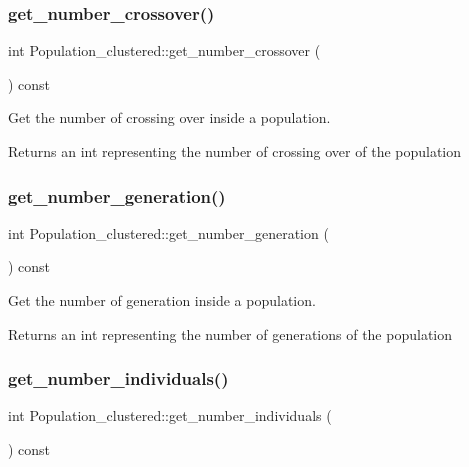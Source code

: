 \subsubsection{\texorpdfstring{get\+\_\+number\+\_\+crossover()}{get\_number\_crossover()}}
{\footnotesize\ttfamily int Population\+\_\+clustered\+::get\+\_\+number\+\_\+crossover (\begin{DoxyParamCaption}{ }\end{DoxyParamCaption}) const}



Get the number of crossing over inside a population. 

\begin{DoxyReturn}{Returns}
an int representing the number of crossing over of the population 
\end{DoxyReturn}
\mbox{\label{class_population__clustered_a91974ba6fab376ce6024ed2d5225104e}} 
\subsubsection{\texorpdfstring{get\+\_\+number\+\_\+generation()}{get\_number\_generation()}}
{\footnotesize\ttfamily int Population\+\_\+clustered\+::get\+\_\+number\+\_\+generation (\begin{DoxyParamCaption}{ }\end{DoxyParamCaption}) const}



Get the number of generation inside a population. 

\begin{DoxyReturn}{Returns}
an int representing the number of generations of the population 
\end{DoxyReturn}
\mbox{\label{class_population__clustered_ad4fcb9b6b9b5c6f35387a7e2cc745daf}} 
\subsubsection{\texorpdfstring{get\+\_\+number\+\_\+individuals()}{get\_number\_individuals()}}
{\footnotesize\ttfamily int Population\+\_\+clustered\+::get\+\_\+number\+\_\+individuals (\begin{DoxyParamCaption}{ }\end{DoxyParamCaption}) const}



